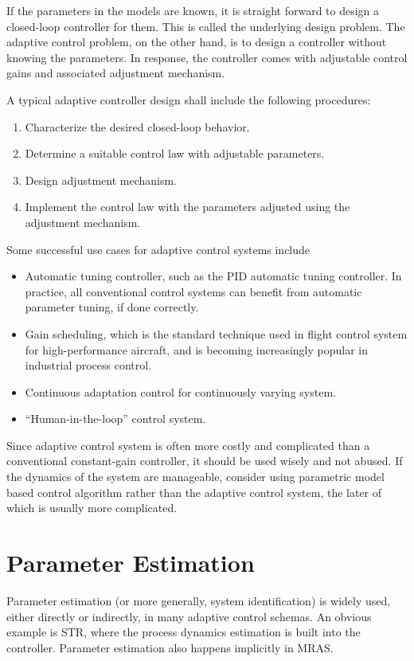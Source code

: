 If the parameters in the models are known, it is straight forward to design a closed-loop controller for them. This is called the underlying design problem. The adaptive control problem, on the other hand, is to design a controller without knowing the parameters. In response, the controller comes with adjustable control gains and associated adjustment mechanism.

A typical adaptive controller design shall include the following procedures:
\begin{enumerate}
	\item Characterize the desired closed-loop behavior.
	\item Determine a suitable control law with adjustable parameters.
	\item Design adjustment mechanism.
	\item Implement the control law with the parameters adjusted using the adjustment mechanism.
\end{enumerate}

Some successful use cases for adaptive control systems include
\begin{itemize}
	\item Automatic tuning controller, such as the PID automatic tuning controller. In practice, all conventional control systems can benefit from automatic parameter tuning, if done correctly.
	\item Gain scheduling, which is the standard technique used in flight control system for high-performance aircraft, and is becoming increasingly popular in industrial process control.
	\item Continuous adaptation control for continuously varying system.
	\item ``Human-in-the-loop'' control system.
\end{itemize}

Since adaptive control system is often more costly and complicated than a conventional constant-gain controller, it should be used wisely and not abused. If the dynamics of the system are manageable, consider using parametric model based control algorithm rather than the adaptive control system, the later of which is usually more complicated.

\section{Parameter Estimation}

Parameter estimation (or more generally, system identification) is widely used, either directly or indirectly, in many adaptive control schemas. An obvious example is STR, where the process dynamics estimation is built into the controller. Parameter estimation also happens implicitly in MRAS.

